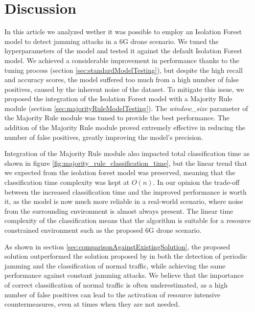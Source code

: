 \documentclass[futureinternet,article,submit,pdftex,moreauthors]{Definitions/mdpi}
\begin{document}
\section{Discussion}


In this article we analyzed wether it was possible to employ an Isolation Forest model to detect jamming attacks in a 6G drone scenario. We tuned the hyperparameters of the model and tested it against the default Isolation Forest model. 
We achieved a considerable improvement in performance thanks to the tuning process (section \ref{sec:standardModelTesting}), but despite the high recall and accuracy scores, the model suffered too much from a high number of false positives, caused by the inherent noise of the dataset. 
To mitigate this issue, we proposed the integration of the Isolation Forest model with a Majority Rule module (section \ref{sec:majorityRuleModelTesting}). The \textit{window\_size} parameter of the Majority Rule module was tuned to provide the best performance.
The addition of the Majority Rule module proved extremely effective in reducing the number of false positives, greatly improving the model's precision. 

Integration of the Majority Rule module also impacted total classification time as shown in figure \ref{fig:majority_rule_classification_time}, but the linear trend \cite{IsolationForestLiu} that we expected from the isolation forest model was preserved, meaning that the classification time complexity was kept at $O(n)$. 
In our opinion the trade-off between the increased classification time and the improved performance is worth it, as the model is now much more reliable in a real-world scenario, where noise from the surrounding environment is almost always present.
The linear time complexity of the classification means that the algorithm is suitable for a resource constrained environment such as the proposed 6G drone scenario.

As shown in section \ref{sec:comparisonAgainstExistingSolution}, the proposed solution outperformed the solution proposed by \cite{JammingDetectionIoT-Hussain} in both the detection of periodic jamming and the classification of normal traffic, while achieving the same performance against constant jamming attacks. 
We believe that the importance of correct classification of normal traffic is often underestimated, as a high number of false positives can lead to the activation of resource intensive countermeasures, even at times when they are not needed. 
\end{document}
